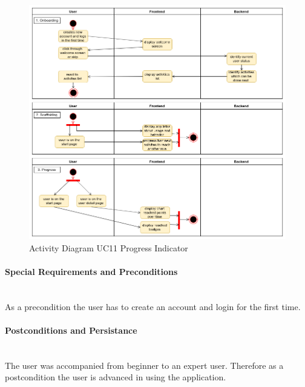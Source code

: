 \begin{figure}[H]
	\centering
	\includegraphics[width=1.0\textwidth]{Content/Domain/UC11ProgressIndicator.png}
	\caption{Activity Diagram  \ac{UC}11 Progress Indicator}
	\label{fig:label12}
\end{figure}

\paragraph*{Special Requirements and Preconditions}\mbox{}\\
As a precondition the user has to create an account and login for the first time. 

\paragraph*{Postconditions and Persistance}\mbox{}\\
The user was accompanied from beginner to an expert user. Therefore as a postcondition the user is advanced in using the application.
